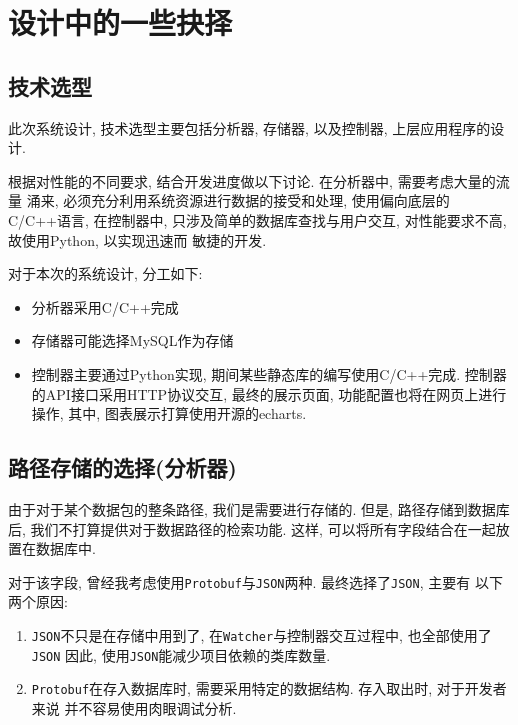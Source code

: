 \chapter{设计中的一些抉择}
\label{chap:设计中的一些抉择}

\section{技术选型}

此次系统设计, 技术选型主要包括分析器, 存储器, 以及控制器,
上层应用程序的设计.

根据对性能的不同要求, 结合开发进度做以下讨论. 在分析器中,
需要考虑大量的流量 涌来, 必须充分利用系统资源进行数据的接受和处理,
使用偏向底层的C/C++语言, 在控制器中, 只涉及简单的数据库查找与用户交互,
对性能要求不高, 故使用Python, 以实现迅速而 敏捷的开发.

对于本次的系统设计, 分工如下:

\begin{itemize}
\item
  分析器采用C/C++完成
\item
  存储器可能选择MySQL作为存储
\item
  控制器主要通过Python实现, 期间某些静态库的编写使用C/C++完成.
  控制器的API接口采用HTTP协议交互, 最终的展示页面,
  功能配置也将在网页上进行操作, 其中, 图表展示打算使用开源的echarts.
\end{itemize}

\section{路径存储的选择(分析器)}

由于对于某个数据包的整条路径, 我们是需要进行存储的. 但是,
路径存储到数据库后, 我们不打算提供对于数据路径的检索功能. 这样,
可以将所有字段结合在一起放置在数据库中.

对于该字段, 曾经我考虑使用\texttt{Protobuf}与\texttt{JSON}两种.
最终选择了\texttt{JSON}, 主要有 以下两个原因:

\begin{enumerate}
\def\labelenumi{\arabic{enumi}.}
\item
  \texttt{JSON}不只是在存储中用到了,
  在\texttt{Watcher}与控制器交互过程中, 也全部使用了\texttt{JSON} 因此,
  使用\texttt{JSON}能减少项目依赖的类库数量.
\item
  \texttt{Protobuf}在存入数据库时, 需要采用特定的数据结构. 存入取出时,
  对于开发者来说 并不容易使用肉眼调试分析.
\end{enumerate}

